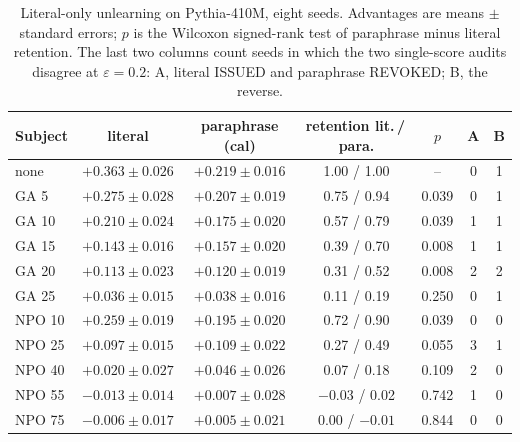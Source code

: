 \documentclass[11pt]{article}
\theoremstyle{definition}
\theoremstyle{remark}
\newcommand{\eps}{\varepsilon}
\begin{document}
\begin{table}[h]
\centering
\caption{Literal-only unlearning on Pythia-410M, eight seeds. Advantages are means $\pm$ standard
errors; $p$ is the Wilcoxon signed-rank test of paraphrase minus literal retention.
The last two columns count seeds in which the two single-score audits disagree at
$\eps=0.2$: A, literal ISSUED and paraphrase REVOKED; B, the reverse.}\label{tab:squeeze}
\small\setlength{\tabcolsep}{5pt}
\begin{tabular}{lcccccc}
\toprule
Subject & literal & paraphrase (cal) & retention lit.\,/\,para. & $p$ & A & B \\
\midrule
none     & $+0.363\pm0.026$ & $+0.219\pm0.016$ & 1.00 / 1.00 & --    & 0 & 1 \\
GA 5     & $+0.275\pm0.028$ & $+0.207\pm0.019$ & 0.75 / 0.94 & 0.039 & 0 & 1 \\
GA 10    & $+0.210\pm0.024$ & $+0.175\pm0.020$ & 0.57 / 0.79 & 0.039 & 1 & 1 \\
GA 15    & $+0.143\pm0.016$ & $+0.157\pm0.020$ & 0.39 / 0.70 & 0.008 & 1 & 1 \\
GA 20    & $+0.113\pm0.023$ & $+0.120\pm0.019$ & 0.31 / 0.52 & 0.008 & 2 & 2 \\
GA 25    & $+0.036\pm0.015$ & $+0.038\pm0.016$ & 0.11 / 0.19 & 0.250 & 0 & 1 \\
NPO 10   & $+0.259\pm0.019$ & $+0.195\pm0.020$ & 0.72 / 0.90 & 0.039 & 0 & 0 \\
NPO 25   & $+0.097\pm0.015$ & $+0.109\pm0.022$ & 0.27 / 0.49 & 0.055 & 3 & 1 \\
NPO 40   & $+0.020\pm0.027$ & $+0.046\pm0.026$ & 0.07 / 0.18 & 0.109 & 2 & 0 \\
NPO 55   & $-0.013\pm0.014$ & $+0.007\pm0.028$ & $-0.03$ / 0.02 & 0.742 & 1 & 0 \\
NPO 75   & $-0.006\pm0.017$ & $+0.005\pm0.021$ & 0.00 / $-0.01$ & 0.844 & 0 & 0 \\
\bottomrule
\end{tabular}
\end{table}
\end{document}
